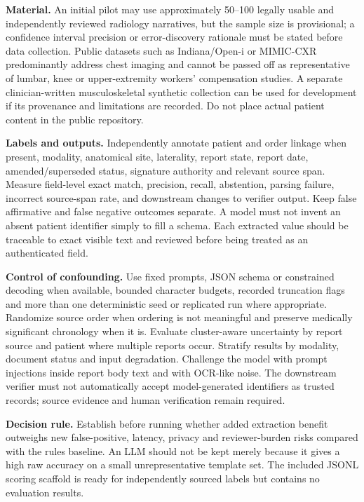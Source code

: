 \documentclass[11pt,twocolumn]{article}
\begin{document}
\textbf{Material.} An initial pilot may use approximately 50--100 legally usable and independently reviewed radiology narratives, but the sample size is provisional; a confidence interval precision or error-discovery rationale must be stated before data collection. Public datasets such as Indiana/Open-i or MIMIC-CXR predominantly address chest imaging and cannot be passed off as representative of lumbar, knee or upper-extremity workers' compensation studies. A separate clinician-written musculoskeletal synthetic collection can be used for development if its provenance and limitations are recorded. Do not place actual patient content in the public repository.

\textbf{Labels and outputs.} Independently annotate patient and order linkage when present, modality, anatomical site, laterality, report state, report date, amended/superseded status, signature authority and relevant source span. Measure field-level exact match, precision, recall, abstention, parsing failure, incorrect source-span rate, and downstream changes to verifier output. Keep false affirmative and false negative outcomes separate. A model must not invent an absent patient identifier simply to fill a schema. Each extracted value should be traceable to exact visible text and reviewed before being treated as an authenticated field.

\textbf{Control of confounding.} Use fixed prompts, JSON schema or constrained decoding when available, bounded character budgets, recorded truncation flags and more than one deterministic seed or replicated run where appropriate. Randomize source order when ordering is not meaningful and preserve medically significant chronology when it is. Evaluate cluster-aware uncertainty by report source and patient where multiple reports occur. Stratify results by modality, document status and input degradation. Challenge the model with prompt injections inside report body text and with OCR-like noise. The downstream verifier must not automatically accept model-generated identifiers as trusted records; source evidence and human verification remain required.

\textbf{Decision rule.} Establish before running whether added extraction benefit outweighs new false-positive, latency, privacy and reviewer-burden risks compared with the rules baseline. An LLM should not be kept merely because it gives a high raw accuracy on a small unrepresentative template set. The included JSONL scoring scaffold is ready for independently sourced labels but contains no evaluation results.
\end{document}
